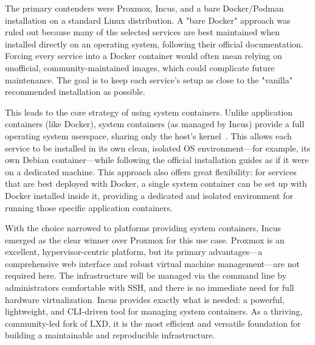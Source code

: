The primary contenders were Proxmox, Incus, and a bare Docker/Podman installation on a standard Linux distribution. A "bare Docker" approach was ruled out because many of the selected services are best maintained when installed directly on an operating system, following their official documentation. Forcing every service into a Docker container would often mean relying on unofficial, community-maintained images, which could complicate future maintenance. The goal is to keep each service's setup as close to the "vanilla" recommended installation as possible.

This leads to the core strategy of using system containers. Unlike application containers (like Docker), system containers (as managed by Incus) provide a full operating system userspace, sharing only the host's kernel~\cite{IncusLinuxContainers2023}. This allows each service to be installed in its own clean, isolated OS environment—for example, its own Debian container—while following the official installation guides as if it were on a dedicated machine. This approach also offers great flexibility: for services that are best deployed with Docker, a single system container can be set up with Docker installed inside it, providing a dedicated and isolated environment for running those specific application containers.

With the choice narrowed to platforms providing system containers, Incus emerged as the clear winner over Proxmox for this use case. Proxmox is an excellent, hypervisor-centric platform, but its primary advantages—a comprehensive web interface and robust virtual machine management—are not required here. The infrastructure will be managed via the command line by administrators comfortable with SSH, and there is no immediate need for full hardware virtualization. Incus provides exactly what is needed: a powerful, lightweight, and CLI-driven tool for managing system containers. As a thriving, community-led fork of LXD, it is the most efficient and versatile foundation for building a maintainable and reproducible infrastructure.

